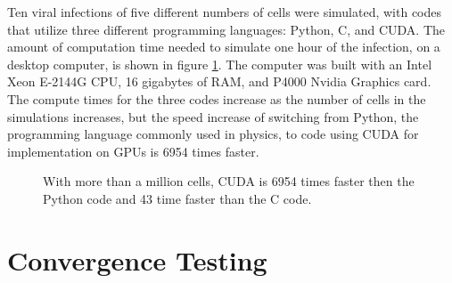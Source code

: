 Ten viral infections of five different numbers of cells were simulated, with codes that utilize three different programming languages: Python, C, and CUDA. The amount of computation time needed to simulate one hour of the infection, on a desktop computer, is shown in figure \ref{fig:SpeedComparison}. The computer was built with an Intel Xeon E-2144G CPU, 16 gigabytes of RAM, and P4000 Nvidia Graphics card. The compute times for the three codes increase as the number of cells in the simulations increases, but the speed increase of switching from Python, the programming language commonly used in physics, to code using CUDA for implementation on GPUs is 6954 times faster.
\begin{figure}
    \centering
\caption{With more than a million cells, CUDA is 6954 times faster then the Python code and 43 time faster than the C code. \label{fig:SpeedComparison}}
\end{figure}

\section{Convergence Testing}

